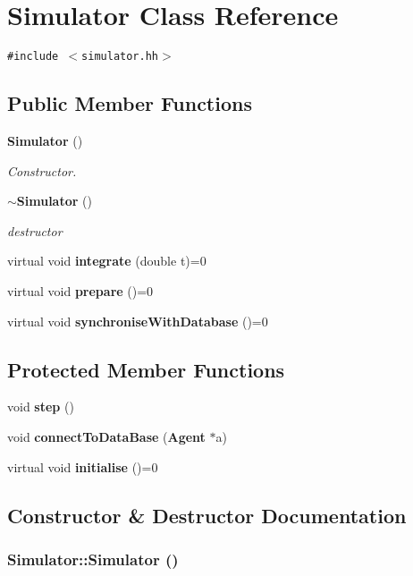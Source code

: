 \section{Simulator Class Reference}
\label{classSimulator}
{\tt \#include $<$simulator.hh$>$}

\subsection*{Public Member Functions}
\begin{CompactItemize}
\item 
{\bf Simulator} ()
\begin{CompactList}\small\item\em Constructor. \item\end{CompactList}\item 
{\bf $\sim$Simulator} ()
\begin{CompactList}\small\item\em destructor \item\end{CompactList}\item 
virtual void {\bf integrate} (double t)=0
\item 
virtual void {\bf prepare} ()=0
\item 
virtual void {\bf synchroniseWithDatabase} ()=0
\end{CompactItemize}
\subsection*{Protected Member Functions}
\begin{CompactItemize}
\item 
void {\bf step} ()
\item 
void {\bf connectToDataBase} ({\bf Agent} $\ast$a)
\item 
virtual void {\bf initialise} ()=0
\end{CompactItemize}


\subsection{Constructor \& Destructor Documentation}
\subsubsection[Simulator]{\setlength{\rightskip}{0pt plus 5cm}Simulator::Simulator ()}\label{classSimulator_031573bfcfe2e0f5c9539bcc1c7fc5d9}



